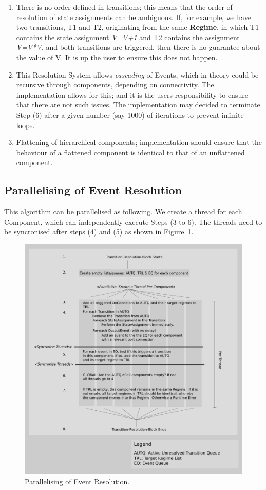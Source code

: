 \documentclass{article}
\newcommand{\Regime}{{\bf{Regime}}\xspace}
\begin{document}
\begin{enumerate}
\item  There is no order defined in transitions; this means
that the order of resolution of state assignments can be ambiguous. If, for
example, we have two transitions, T1 and T2, originating from the same \Regime,
in which T1 contains the state assignment \textsl{V=V+1} and T2 contains the
assignment \textsl{V=V*V}, and both transitions are triggered, then there is no
guarantee about the value of V. It is up the user to ensure this does not
happen.

\item This Resolution System allows \emph{cascading} of Events, which in theory
could be recursive through components, depending on connectivity. The
implementation allows for this; and it is the users responsibility to ensure
that there are not such issues. The implementation may decided to terminate
Step (6) after a given number (say 1000) of iterations to prevent infinite
loops.

\item Flattening of hierarchical components; implementation should ensure that
the behaviour of a flattened component is identical to that of an unflattened
component.
\end{enumerate}

\subsection{Parallelising of Event Resolution}

This algorithm can be parallelised as following. We create a thread for each
Component, which can independently execute Steps (3 to 6). The threads need
to be syncronised after steps (4) and (5) as shown in
Figure~\ref{ParallelisingTransitions}.

\begin{figure}[htb!]
\center
\includegraphics[width=14cm]{images/ParallelisingTransitions.pdf}
\protect\caption{Parallelising of Event Resolution.}
\label{ParallelisingTransitions}
\end{figure}


%
\end{document}
